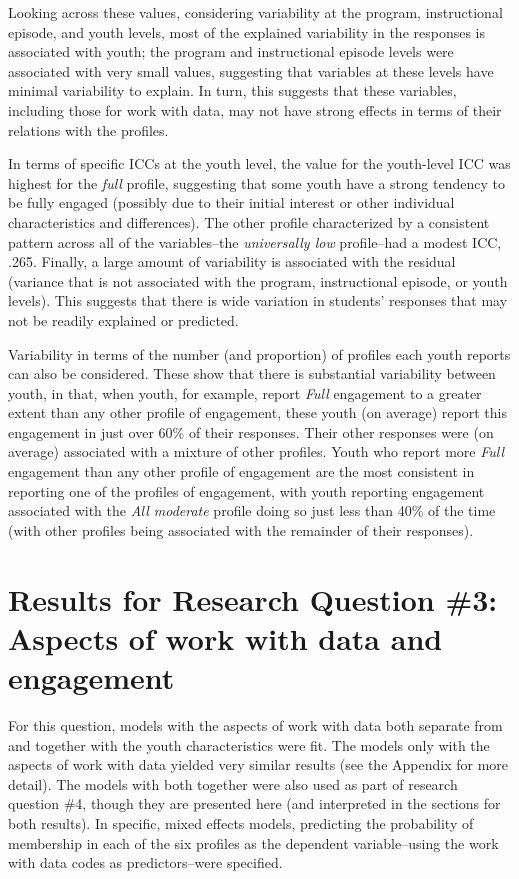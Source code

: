 \documentclass[]{book}
\theoremstyle{definition}
\theoremstyle{definition}
\theoremstyle{definition}
\theoremstyle{remark}
\begin{document}
Looking across these values, considering variability at the program,
instructional episode, and youth levels, most of the explained
variability in the responses is associated with youth; the program and
instructional episode levels were associated with very small values,
suggesting that variables at these levels have minimal variability to
explain. In turn, this suggests that these variables, including those
for work with data, may not have strong effects in terms of their
relations with the profiles.

In terms of specific ICCs at the youth level, the value for the
youth-level ICC was highest for the \emph{full} profile, suggesting that
some youth have a strong tendency to be fully engaged (possibly due to
their initial interest or other individual characteristics and
differences). The other profile characterized by a consistent pattern
across all of the variables--the \emph{universally low} profile--had a
modest ICC, .265. Finally, a large amount of variability is associated
with the residual (variance that is not associated with the program,
instructional episode, or youth levels). This suggests that there is
wide variation in students' responses that may not be readily explained
or predicted.

Variability in terms of the number (and proportion) of profiles each
youth reports can also be considered. These show that there is
substantial variability between youth, in that, when youth, for example,
report \emph{Full} engagement to a greater extent than any other profile
of engagement, these youth (on average) report this engagement in just
over 60\% of their responses. Their other responses were (on average)
associated with a mixture of other profiles. Youth who report more
\emph{Full} engagement than any other profile of engagement are the most
consistent in reporting one of the profiles of engagement, with youth
reporting engagement associated with the \emph{All moderate} profile
doing so just less than 40\% of the time (with other profiles being
associated with the remainder of their responses).

\section{Results for Research Question \#3: Aspects of work with data
and
engagement}\label{results-for-research-question-3-aspects-of-work-with-data-and-engagement}

For this question, models with the aspects of work with data both
separate from and together with the youth characteristics were fit. The
models only with the aspects of work with data yielded very similar
results (see the Appendix for more detail). The models with both
together were also used as part of research question \#4, though they
are presented here (and interpreted in the sections for both results).
In specific, mixed effects models, predicting the probability of
membership in each of the six profiles as the dependent variable--using
the work with data codes as predictors--were specified.
\end{document}
